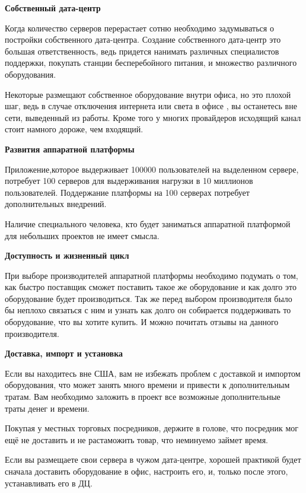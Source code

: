 
\textbf{ Собственный дата-центр } %

Когда количество серверов перерастает сотню необходимо задумываться о постройки собственного дата-центра. Создание собственного дата-центр это большая ответственность, ведь придется нанимать различных специалистов поддержки, покупать станции бесперебойного питания, и множество различного оборудования.

Некоторые размещают собственное оборудование внутри офиса, но это плохой шаг, ведь в случае отключения интернета или света в офисе , вы останетесь вне сети, выведенный из работы. Кроме того у многих провайдеров исходящий канал стоит намного дороже, чем входящий.

\textbf{ Развития аппаратной платформы } %

Приложение,которое выдерживает 100000 пользователей на выделенном сервере, потребует 100 серверов для выдерживания нагрузки в 10 миллионов пользователей. Поддержание платформы на 100 серверах потребует дополнительных внедрений.

Наличие специального человека, кто будет заниматься аппаратной платформой для небольших проектов не имеет смысла.


\textbf{ Доступность и жизненный цикл } %

При выборе производителей аппаратной платформы необходимо подумать о том, как быстро поставщик сможет поставить такое же оборудование и как долго это оборудование будет производиться. Так же перед выбором производителя  было бы неплохо связаться с ним и узнать как долго он собирается поддерживать то оборудование, что вы хотите купить. И можно почитать отзывы на данного производителя.

\textbf{ Доставка, импорт и установка } %

Если вы находитесь вне США, вам не избежать проблем с доставкой и импортом оборудования, что может занять много времени и привести к дополнительным тратам. Вам необходимо заложить в проект все возможные дополнительные траты денег и времени.

Покупая у местных торговых посредников, держите в голове, что посредник мог ещё не доставить и не растаможить товар, что неминуемо займет время.

Если вы размещаете свои сервера в чужом дата-центре, хорошей практикой будет сначала доставить оборудование в офис, настроить его, и, только после этого, устанавливать его в ДЦ.

